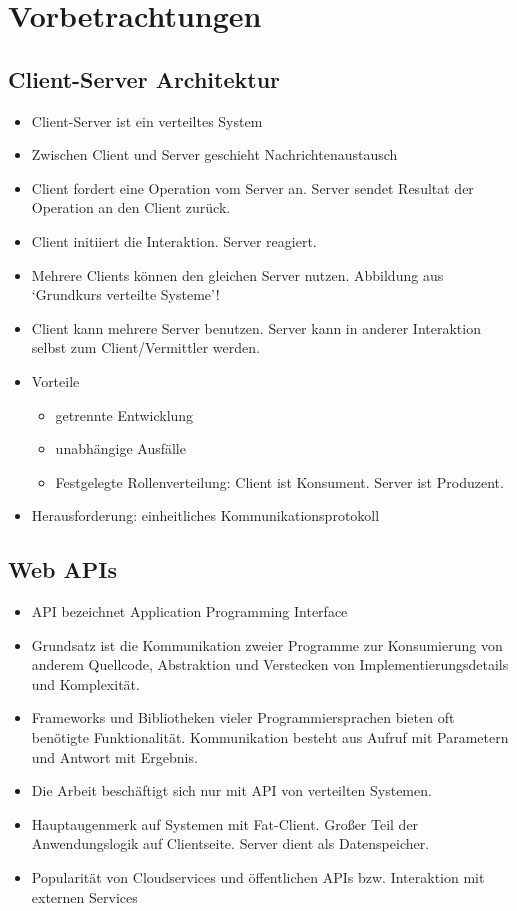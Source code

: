 \section{Vorbetrachtungen}
\subsection{Client-Server Architektur}
\begin{itemize}
  \item Client-Server ist ein verteiltes System
  \item Zwischen Client und Server geschieht Nachrichtenaustausch
  \item Client fordert eine Operation vom Server an. Server sendet Resultat der Operation an den Client zurück.
  \item Client initiiert die Interaktion. Server reagiert.
  \item Mehrere Clients können den gleichen Server nutzen. Abbildung aus `Grundkurs verteilte Systeme'!
  \item Client kann mehrere Server benutzen. Server kann in anderer Interaktion selbst zum Client/Vermittler werden.
  \item Vorteile
    \begin{itemize}
      \item getrennte Entwicklung
      \item unabhängige Ausfälle
      \item Festgelegte Rollenverteilung: Client ist Konsument. Server ist Produzent.
    \end{itemize}
  \item Herausforderung: einheitliches Kommunikationsprotokoll
\end{itemize}

\subsection{Web APIs}
\begin{itemize}
  \item API bezeichnet Application Programming Interface
  \item Grundsatz ist die Kommunikation zweier Programme zur Konsumierung von anderem Quellcode, Abstraktion und Verstecken von Implementierungsdetails und Komplexität.
  \item Frameworks und Bibliotheken vieler Programmiersprachen bieten oft benötigte Funktionalität. Kommunikation besteht aus Aufruf mit Parametern und Antwort mit Ergebnis.
  \item Die Arbeit beschäftigt sich nur mit API von verteilten Systemen.
  \item Hauptaugenmerk auf Systemen mit Fat-Client. Großer Teil der Anwendungslogik auf Clientseite. Server dient als Datenspeicher.
  \item Popularität von Cloudservices und öffentlichen APIs bzw. Interaktion mit externen Services
\end{itemize}